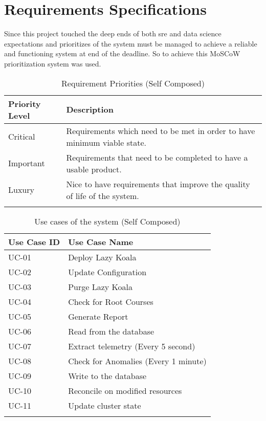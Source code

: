 \section{Requirements Specifications}

Since this project touched the deep ends of both \ac{sre} and data science expectations and prioritizes of the system must be managed to achieve a reliable and functioning system at end of the deadline. So to achieve this MoSCoW prioritization system was used.

\begin{longtable}{|p{25mm}|p{128mm}|}
\hline
    \textbf{Priority Level} &
    \textbf{Description} \\ \hline
    
    Critical  &
    Requirements which need to be met in order to have minimum viable state. \\ \hline

    Important &
    Requirements that need to be completed to have a usable product. \\ \hline

    Luxury &
    Nice to have requirements that improve the quality of life of the system. \\ \hline
\caption{Requirement Priorities (Self Composed)}
\end{longtable}

\begin{longtable}{|p{35mm}|p{118mm}|}
\hline
    \textbf{Use Case ID} & \textbf{Use Case Name }              \\ \hline
    UC-01                & Deploy Lazy Koala                    \\ \hline
    UC-02                & Update Configuration                 \\ \hline
    UC-03                & Purge Lazy Koala                     \\ \hline
    UC-04                & Check for Root Courses               \\ \hline
    UC-05                & Generate Report                      \\ \hline
    UC-06                & Read from the database               \\ \hline
    UC-07                & Extract telemetry (Every 5 second)   \\ \hline
    UC-08                & Check for Anomalies (Every 1 minute) \\ \hline
    UC-09                & Write to the database                \\ \hline
    UC-10                & Reconcile on modified resources      \\ \hline
    UC-11                & Update cluster state                 \\ \hline
\caption{Use cases of the system (Self Composed)}
\end{longtable}

